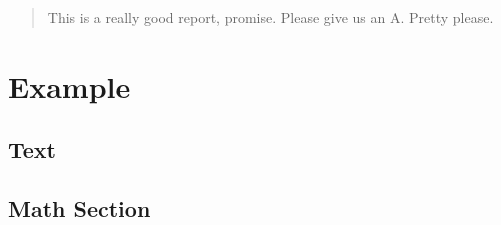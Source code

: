 \documentclass[12pt, fleqn]{report}
\begin{document}
\begingroup
\thispagestyle{empty}

\endgroup


\begin{abstract}
This is a really good report, promise. Please give us an A. Pretty please.
\end{abstract}

\usechapterimagefalse


\printnomenclature


\pagestyle{empty}
\tableofcontents
\pagestyle{fancy}

\usechapterimagetrue
{}

\chapter{Example} \label{cha:example}
\section{Text} \label{sec:text}
\lipsum[1-7]
\section{Math Section} \label{sec:math_section}
\blindmathpaper

% 

% 

% 

% 
\end{document}
